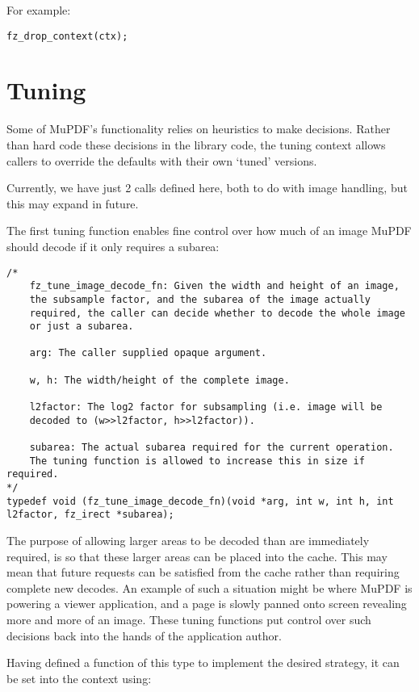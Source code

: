 \documentclass[oneside]{book}
\begin{document}
For example:

\begin{lstlisting}
fz_drop_context(ctx);
\end{lstlisting}

\section{Tuning}
\label{Tuning}

Some of MuPDF's functionality relies on heuristics to make decisions. Rather than hard code these decisions in the library code, the tuning context allows callers to override the defaults with their own `tuned' versions.

Currently, we have just 2 calls defined here, both to do with image handling, but this may expand in future.

The first tuning function enables fine control over how much of an image MuPDF should decode if it only requires a subarea:

\begin{lstlisting}
/*
	fz_tune_image_decode_fn: Given the width and height of an image,
	the subsample factor, and the subarea of the image actually
	required, the caller can decide whether to decode the whole image
	or just a subarea.

	arg: The caller supplied opaque argument.

	w, h: The width/height of the complete image.

	l2factor: The log2 factor for subsampling (i.e. image will be
	decoded to (w>>l2factor, h>>l2factor)).

	subarea: The actual subarea required for the current operation.
	The tuning function is allowed to increase this in size if required.
*/
typedef void (fz_tune_image_decode_fn)(void *arg, int w, int h, int l2factor, fz_irect *subarea);
\end{lstlisting}

The purpose of allowing larger areas to be decoded than are immediately required, is so that these larger areas can be placed into the cache. This may mean that future requests can be satisfied from the cache rather than requiring complete new decodes. An example of such a situation might be where MuPDF is powering a viewer application, and a page is slowly panned onto screen revealing more and more of an image. These tuning functions put control over such decisions back into the hands of the application author.

Having defined a function of this type to implement the desired strategy, it can be set into the context using:
\end{document}
